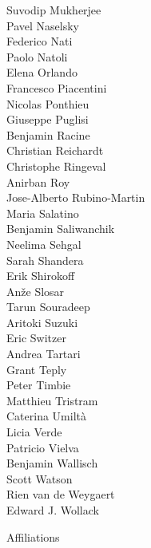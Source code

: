\documentclass[PICOReport.tex]{subfiles}
\begin{document}
{\begin{multicols}{4}
Suvodip Mukherjee               \\
Pavel Naselsky                  \\
Federico Nati                   \\
Paolo Natoli                    \\
Elena Orlando                   \\
Francesco Piacentini            \\
Nicolas Ponthieu                \\
Giuseppe Puglisi                \\
Benjamin Racine                 \\
Christian Reichardt             \\
Christophe Ringeval             \\
Anirban Roy                     \\
Jose-Alberto Rubino-Martin      \\
Maria Salatino                  \\
Benjamin Saliwanchik            \\
Neelima Sehgal                  \\
Sarah Shandera                  \\
Erik Shirokoff                  \\
An\v{z}e Slosar                 \\
Tarun Souradeep                 \\
Aritoki Suzuki                  \\
Eric Switzer                    \\
Andrea Tartari                  \\
Grant Teply                     \\
Peter Timbie                    \\
Matthieu Tristram               \\
Caterina Umilt\`{a}             \\
Licia Verde                     \\
Patricio Vielva                 \\
Benjamin Wallisch               \\
Scott Watson                    \\
Rien van de Weygaert            \\
Edward J. Wollack               
\end{multicols}
}

\newpage
\Large  {\centerline {Affiliations}}
\end{document}
